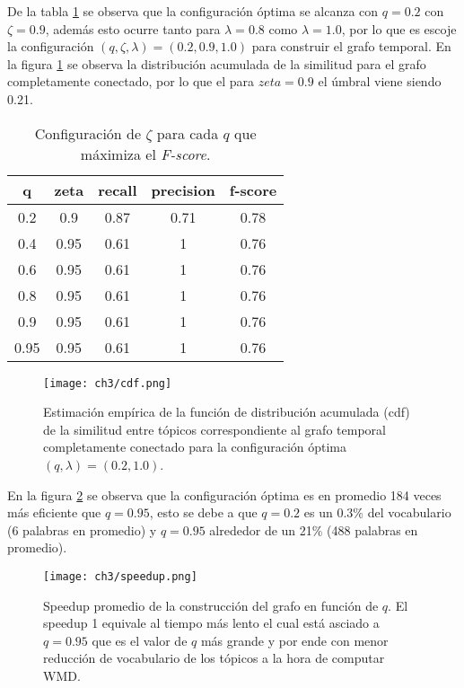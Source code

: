 \documentclass[letterpaper,12pt,oneside]{book} %
\begin{document}
De la tabla \ref{table:f_score} se observa que la configuración óptima se alcanza con $q=0.2$ con $\zeta=0.9$, además esto ocurre tanto para $\lambda=0.8$ como $\lambda=1.0$, por lo que es escoje la configuración $(q, \zeta, \lambda) = (0.2, 0.9, 1.0)$ para construir el grafo temporal. En la figura \ref{img:cdf} se observa la distribución acumulada de la similitud para el grafo completamente conectado, por lo que el para $zeta=0.9$ el úmbral viene siendo 0.21.

\begin{table}[H]
    \begin{tabular}{|c|c|c|c|c|}
    \hline
    \textbf{q} & \textbf{zeta} & \textbf{recall} & \textbf{precision} & \textbf{f-score} \\ \hline
    0.2        & 0.9           & 0.87            & 0.71               & 0.78             \\ \hline
    0.4        & 0.95          & 0.61            & 1                  & 0.76             \\ \hline
    0.6        & 0.95          & 0.61            & 1                  & 0.76             \\ \hline
    0.8        & 0.95          & 0.61            & 1                  & 0.76             \\ \hline
    0.9        & 0.95          & 0.61            & 1                  & 0.76             \\ \hline
    0.95       & 0.95          & 0.61            & 1                  & 0.76             \\ \hline
    \end{tabular}
    \caption{Configuración de $\zeta$ para cada $q$ que máximiza el \textit{F-score}.}
    \label{table:f_score}
\end{table}


\begin{figure}
    \centering
    \texttt{[image: ch3/cdf.png]}
    \caption{Estimación empírica de la función de distribución acumulada (cdf) de la similitud entre tópicos correspondiente al grafo temporal completamente conectado para la configuración óptima $(q, \lambda)=(0.2, 1.0)$.}
    \label{img:cdf}
\end{figure}

En la figura \ref{img:speedup} se observa que la configuración óptima es en promedio 184 veces más eficiente que $q=0.95$, esto se debe a que $q=0.2$ es un 0.3\% del vocabulario (6 palabras en promedio) y $q=0.95$ alrededor de un 21\% (488 palabras en promedio).
\begin{figure}
    \centering
    \texttt{[image: ch3/speedup.png]}
    \caption{Speedup promedio de la construcción del grafo en función de $q$. El speedup 1 equivale al tiempo más lento el cual está asciado a $q=0.95$ que es el valor de $q$ más grande y por ende con menor reducción de vocabulario de los tópicos a la hora de computar WMD.}
    \label{img:speedup}
\end{figure}
\end{document}

